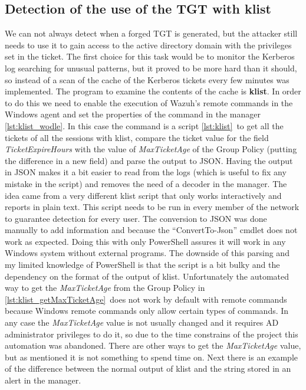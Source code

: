 \subsection{Detection of the use of the TGT with klist} \label{klist_detection}
We can not always detect when a forged TGT is generated, but the attacker still needs to use it to gain access to the active directory domain with the privileges set in the ticket. The first choice for this task would be to monitor the Kerberos log searching for unusual patterns, but it proved to be more hard than it should, so instead of a scan of the cache of the Kerberos tickets every few minutes was implemented.
\linej
The program to examine the contents of the cache is \textbf{klist}.
\linej
\linej
In order to do this we need to enable the execution of Wazuh's remote commands in the Windows agent and set the properties of the command in the manager \ref{lst:klist_wodle}\cite{wazuh_remote_command}.
\linej
\linej
In this case the command is a script \ref{lst:klist}\ to get all the tickets of all the sessions with klist, compare the ticket value for the field \textit{TicketExpireHours} with the value of \textit{MaxTicketAge} of the Group Policy (putting the difference in a new field) and parse the output to JSON. Having the output in JSON makes it a bit easier to read from the logs (which is useful to fix any mistake in the script) and removes the need of a decoder in the manager.
The idea came from a very different klist script that only works interactively and reports in plain text\cite{klist_script_idea}.
\linej
This script needs to be run in every member of the network to guarantee detection for every user.
\linej
The conversion to JSON was done manually to add information and because the ``ConvertTo-Json'' cmdlet does not work as expected.
Doing this with only PowerShell assures it will work in any Windows system without external programs. The downside of this parsing and my limited knowledge of PowerShell is that the script is a bit bulky and the dependency on the format of the output of klist.
\linej
\linej
Unfortunately the automated way to get the \textit{MaxTicketAge} from the Group Policy in \ref{lst:klist_getMaxTicketAge}\ does not work by default with remote commands because Windows remote commands only allow certain types of commands.
In any case the \textit{MaxTicketAge} value is not usually changed and it requires AD administrator privileges to do it, so due to the time constrains of the project this automation was abandoned. There are other ways to get the \textit{MaxTicketAge} value, but as mentioned it is not something to spend time on.
\linej
\linej
Next there is an example of the difference between the normal output of klist and the string stored in an alert in the manager.

